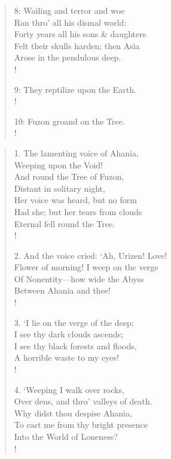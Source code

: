 \documentclass[9pt]{extarticle}
\begin{document}
\begin{verse}
\begin{altverse}
		8: Wailing and terror and woe\\
		Ran thro’ all his dismal world:\\
		Forty years all his sons \& daughters\\
		Felt their skulls harden; then Asia\\
		Arose in the pendulous deep.\\!
		
		9: They reptilize upon the Earth.\\!
		
		10: Fuzon groand on the Tree.\\!
		
\end{altverse}
\end{verse}	

\begin{verse}
\begin{altverse} 
		
		1. The lamenting voice of Ahania,\\
		Weeping upon the Void!\\
		And round the Tree of Fuzon,\\
		Distant in solitary night,\\
		Her voice was heard, but no form\\
		Had she; but her tears from clouds\\
		Eternal fell round the Tree.\\!
		
		2. And the voice cried: ‘Ah, Urizen! Love!\\
		Flower of morning! I weep on the verge\\
		Of Nonentity—how wide the Abyss\\
		Between Ahania and thee!\\!
		
		3. ‘I lie on the verge of the deep;\\
		I see thy dark clouds ascends;\\
		I see thy black forests and floods,\\
		A horrible waste to my eyes!\\!
		
		4. ‘Weeping I walk over rocks,\\
		Over dens, and thro’ valleys of death.\\
		Why didst thou despise Ahania,\\
		To cast me from thy bright presence\\
		Into the World of Loneness?\\!
		

\end{altverse}
\end{verse}
\end{document}
